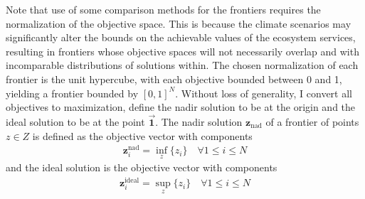 Note that use of some comparison methods for the frontiers requires the normalization of the objective space. This is because the climate scenarios may significantly alter the bounds on the achievable values of the ecosystem services, resulting in frontiers whose objective spaces will not necessarily overlap and with incomparable distributions of solutions within. The chosen normalization of each frontier is the unit hypercube, with each objective bounded between 0 and 1, yielding a frontier bounded by $[0,1]^N$. Without loss of generality, I convert all objectives to maximization, define the nadir solution to be at the origin and the ideal solution to be at the point $\vec{\mathbf{1}}$. The nadir solution $\mathbf{z}_{\text{nad}}$ of a frontier of points $z \in Z$ is defined as the objective vector with components
\begin{align}
\mathbf{z}_i^{\text{nad}} = \inf_{z} \{ z_i \} \quad \forall 1 \le i \le N
\end{align}
and the ideal solution is the objective vector with components
\begin{align}
\mathbf{z}_i^{\text{ideal}} = \sup_{z} \{ z_i \} \quad \forall 1 \le i \le N
\end{align}

